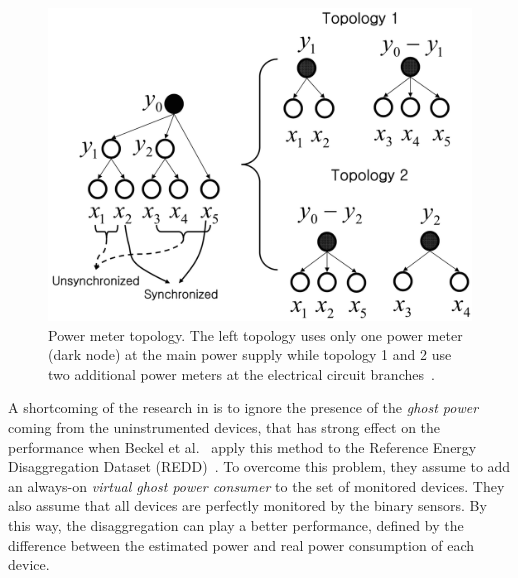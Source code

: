 \begin{figure}
\centering
\includegraphics[width=.6\textwidth]{./chapters/chapter2/images/submeters.pdf} 
\caption{Power meter topology. The left topology uses only one power meter (dark node) at the main power supply while topology 1 and 2 use two additional power meters at the electrical circuit branches~\cite{Jung2010}.} 
\label{fig:A3} 
\end{figure}

A shortcoming of the research in \cite{Jung2010,Jung2014} is to ignore the presence of the \textit{ghost power} coming from the uninstrumented devices, that has strong effect on the performance when Beckel et al.~\cite{Beckel2012} apply this method to the Reference Energy Disaggregation Dataset (REDD)~\cite{Kolter11redd}. To overcome this problem, they assume to add  an always-on \textit{virtual ghost power consumer} to the set of monitored devices. They also assume that all devices are perfectly monitored by the binary sensors. By this way, the disaggregation can play a better performance, defined by the difference between the estimated power and real power consumption of each device.




